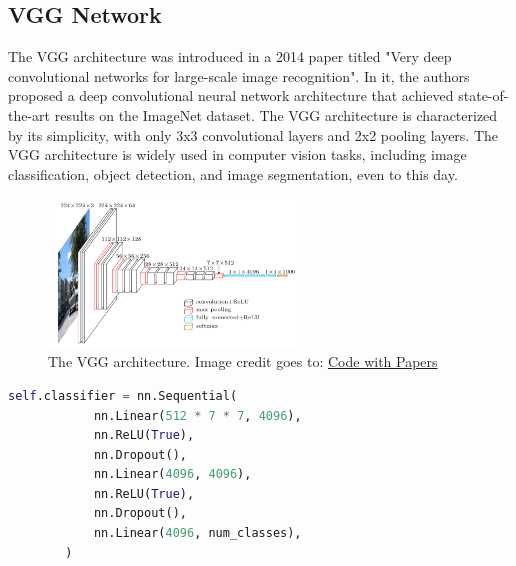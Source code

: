 \subsection{VGG Network}
\label{appendix:vgg_network}

The VGG architecture was introduced in a 2014 paper \cite{vgg16} titled "Very deep convolutional networks for large-scale image recognition". In it, the authors proposed a deep convolutional neural network architecture that achieved state-of-the-art results on the ImageNet dataset. The VGG architecture is characterized by its simplicity, with only 3x3 convolutional layers and 2x2 pooling layers. The VGG architecture is widely used in computer vision tasks, including image classification, object detection, and image segmentation, even to this day.


\begin{figure}
    \centering
    \includegraphics[width=0.6\textwidth]{images/appendix/vgg.png}
    \caption{The VGG architecture. Image credit goes to: \href{https://paperswithcode.com/method/vgg}{Code with Papers} }
\end{figure}


\begin{lstlisting}[language=Python, caption=Simple PyTorch implementation of the VGG network. Credit goes to: \href{https://github.com/pytorch/vision/tree/6db1569c89094cf23f3bc41f79275c45e9fcb3f3/torchvision/models}{pytorch github page}.]
    self.classifier = nn.Sequential(
            nn.Linear(512 * 7 * 7, 4096),
            nn.ReLU(True),
            nn.Dropout(),
            nn.Linear(4096, 4096),
            nn.ReLU(True),
            nn.Dropout(),
            nn.Linear(4096, num_classes),
        )
\end{lstlisting}
